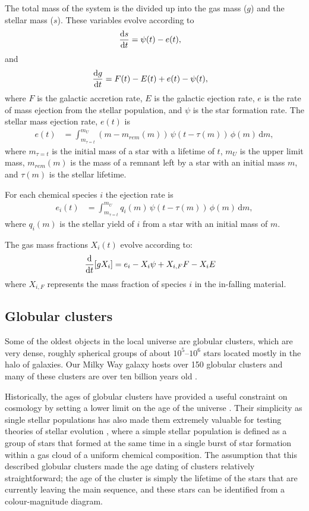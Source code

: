 The total mass of the system is the divided up into the gas mass ($g$) and the stellar mass ($s$). These variables evolve according to
\begin{align*}
	\frac{\mathrm{d} s}{\mathrm{d} t} &= \psi(t) - e(t),
\end{align*}
and
\begin{align*}
	\frac{\mathrm{d} g}{\mathrm{d} t} &= F(t) - E(t) + e(t) -  \psi(t),
\end{align*}
where $F$ is the galactic accretion rate, $E$ is the galactic ejection rate, $e$ is the rate of mass ejection from the stellar population, and $\psi$ is the star formation rate. The stellar mass ejection rate, $e(t)$ is
\begin{align*}
	e(t) &= \int_{m_{\tau=t}}^{m_U}(m-m_{rem}(m)) \, \psi(t-\tau(m)) \,\phi(m) \,\mathrm{d}m,
\end{align*}
where $m_{\tau=t}$ is the initial mass of a star with a lifetime of $t$, $m_U$ is the upper limit mass, $m_{rem}(m)$ is the mass of a remnant left by a star with an initial mass $m$, and $\tau(m)$ is the stellar lifetime.

For each chemical species $i$ the ejection rate is
\begin{align*}
	e_i(t) &= \int_{m_{\tau=t}}^{m_U} q_i(m) \, \psi(t-\tau(m))\,\phi(m) \,\mathrm{d}m,
\end{align*}
where $q_i(m)$ is the stellar yield of $i$ from a star with an initial mass of $m$.

The gas mass fractions $X_i(t)$ evolve according to:
\begin{align*}
	\frac{\mathrm{d}}{\mathrm{d} t}[g X_i] &= e_i - X_i\psi + X_{i,F}F - X_i E
\end{align*}
where $X_{i,F}$ represents the mass fraction of species $i$ in the in-falling material.

\subsection{Globular clusters}
Some of the oldest objects in the local universe are globular clusters, which are very dense, roughly spherical groups of about $10^5$--$10^6$ stars located mostly in the halo of galaxies. Our Milky Way galaxy hosts over 150 globular clusters \citep[][2010 edition]{Harris:1996fr} and many of these clusters are over ten billion years old \citep{Dotter:2009cq}.

Historically, the ages of globular clusters have provided a useful constraint on cosmology by setting a lower limit on the age of the universe \citep{Chaboyer:1996hh,Dotter:2010ek}. Their simplicity as single stellar populations has also made them extremely valuable for testing theories of stellar evolution \citep{Johnson:1955ec}, where a simple stellar population is defined as a group of stars that formed at the same time in a single burst of star formation within a gas cloud of a uniform chemical composition. The assumption that this described globular clusters made the age dating of clusters relatively straightforward; the age of the cluster is simply the lifetime of the stars that are currently leaving the main sequence, and these stars can be identified from a colour-magnitude diagram.

